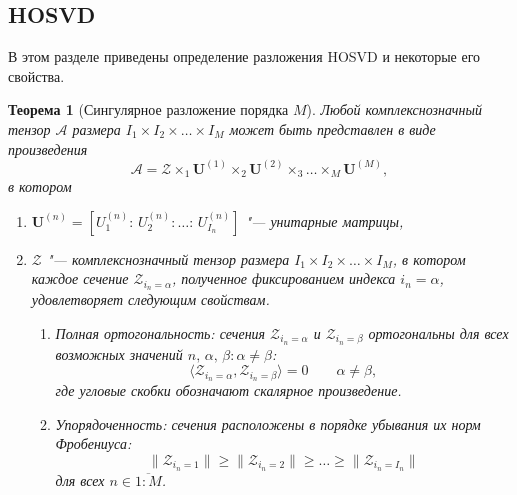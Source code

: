 \documentclass[specialist,
  substylefile=spbu_report.rtx,
subf,href,colorlinks=true, 12pt]{disser}
\theoremstyle{plain}
\newtheorem{theorem}{Теорема}
\theoremstyle{definition}
\newtheorem{definition}{Определение}[section]
\theoremstyle{remark}
\begin{document}

\subsection{HOSVD}\label{subsec:hosvd}
В этом разделе приведены определение разложения HOSVD и некоторые
его свойства.

\begin{theorem}
  [Сингулярное разложение порядка $M$]
  Любой комплекснозначный тензор $\mathcal{A}$ размера $I_1\times I_2
  \times \ldots \times I_M$ может быть представлен
  в виде произведения
  \begin{equation}
    \mathcal{A} = \mathcal{Z} \times_1 \mathbf{U}^{(1)} \times_2
    \mathbf{U}^{(2)} \times_3 \ldots \times_M
    \mathbf{U}^{(M)},\label{eq:hosvd}
  \end{equation}
  в котором
  \begin{enumerate}
    \item $\mathbf{U}^{(n)}=\left[U_1^{(n)}:\, U_2^{(n)}:\ldots:\,
      U_{I_n}^{(n)} \right]$ "--- унитарные матрицы,
    \item $\mathcal{Z}$ "--- комплекснозначный тензор размера
      $I_1\times I_2 \times \ldots \times I_M$, в котором
      каждое сечение $\mathcal Z_{i_n=\alpha}$, полученное
      фиксированием индекса $i_n=\alpha$, удовлетворяет следующим свойствам.
      \begin{enumerate}
        \item Полная ортогональность: сечения $\mathcal
          Z_{i_n=\alpha}$ и $\mathcal Z_{i_n=\beta}$ ортогональны для
          всех возможных значений
          $n,\, \alpha,\, \beta: \alpha\ne\beta$:
          \[
            \langle\mathcal Z_{i_n=\alpha},\mathcal
            Z_{i_n=\beta}\rangle=0 \qquad \alpha\ne\beta,
          \]
          где угловые скобки обозначают скалярное произведение.
        \item Упорядоченность: сечения расположены в порядке убывания
          их норм Фробениуса:
          \begin{equation}
            \|\mathcal Z_{i_n=1}\|\geqslant\|\mathcal Z_{i_n=2}\|
            \geqslant \ldots \geqslant\|\mathcal Z_{i_n=I_n}\|\label{eq:order}
          \end{equation}
          для всех $n\in \overline{1:M}$.
      \end{enumerate}
  \end{enumerate}
\end{theorem}
\end{document}
